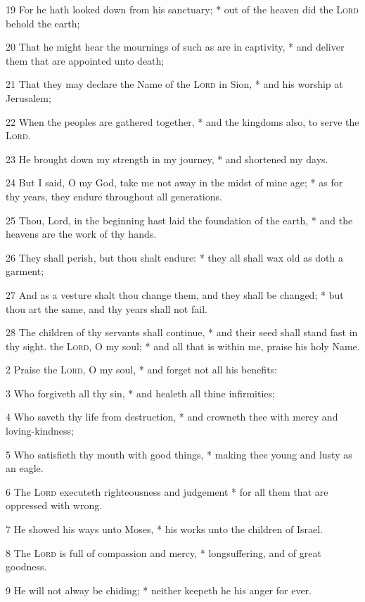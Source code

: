 19 For he hath looked down from his sanctuary; * out of the heaven did the {\textsc{Lord}} behold the earth;\par
20 That he might hear the mournings of such as are in captivity, * and deliver them that are appointed unto death;\par
21 That they may declare the Name of the {\textsc{Lord}} in Sion, * and his worship at Jerusalem;\par
22 When the peoples are gathered together, * and the kingdoms also, to serve the {\textsc{Lord}}.\par
23 He brought down my strength in my journey, * and shortened my days.\par
24 But I said, O my God, take me not away in the midst of mine age; * as for thy years, they endure throughout all generations.\par
25 Thou, Lord, in the beginning hast laid the foundation of the earth, * and the heavens are the work of thy hands.\par
26 They shall perish, but thou shalt endure: * they all shall wax old as doth a garment;\par
27 And as a vesture shalt thou change them, and they shall be changed; * but thou art the same, and thy years shall not fail.\par
28 The children of thy servants shall continue, * and their seed shall stand fast in thy sight.
 the {\textsc{Lord}}, O my soul; * and all that is within me, praise his holy Name.\par
2 Praise the {\textsc{Lord}}, O my soul, * and forget not all his benefits:\par
3 Who forgiveth all thy sin, * and healeth all thine infirmities;\par
4 Who saveth thy life from destruction, * and crowneth thee with mercy and loving-kindness;\par
5 Who satisfieth thy mouth with good things, * making thee young and lusty as an eagle.\par
6 The {\textsc{Lord}} executeth righteousness and judgement * for all them that are oppressed with wrong.\par
7 He showed his ways unto Moses, * his works unto the children of Israel.\par
8 The {\textsc{Lord}} is full of compassion and mercy, * longsuffering, and of great goodness.\par
9 He will not alway be chiding; * neither keepeth he his anger for ever.\par
